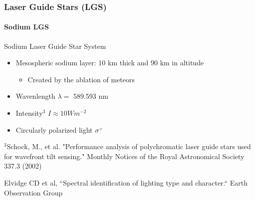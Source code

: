 \documentclass{beamer}
\newcommand{\btVFill}{\vskip0pt plus 1filll}
\begin{document}
\begin{frame}
  \frametitle{Laser Guide Stars (LGS)}
  \framesubtitle{Sodium LGS}
  Sodium Laser Guide Star System
  \begin{itemize}
	\item Mesospheric sodium layer: 10 km thick and 90 km in altitude
	  \begin{itemize}
		\item Created by the ablation of meteors
	  \end{itemize}
  \end{itemize}
  \begin{minipage}{.45\textwidth}
  \begin{itemize}
	\item Wavenlength $\lambda=$ 589.593 nm
	\item Intensity$^3$ $I \approx 10 Wm^{-2}$
	\item Circularly polarized light $\sigma ^+$
  \end{itemize}
\end{minipage}
\begin{minipage}{.35\textwidth}
\end{minipage}
	{\tiny $^3$Schock, M., et al. "Performance analysis of polychromatic laser guide stars used for wavefront tilt sensing." Monthly Notices of the Royal Astronomical Society 337.3 (2002)}
 
	  {\tiny Elvidge CD et al, ``Spectral identification of lighting type and character.`` Earth Observation Group}
\end{frame}
\end{document}
